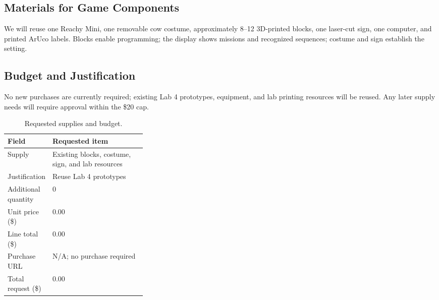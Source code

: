 \documentclass[conference,12pt,letterpaper]{IEEEtran}
\begin{document}
\subsection{Materials for Game Components}

We will reuse one Reachy Mini, one removable cow costume, approximately 8--12 3D-printed blocks, one laser-cut sign, one computer, and printed ArUco labels. Blocks enable programming; the display shows missions and recognized sequences; costume and sign establish the setting.

\subsection{Budget and Justification}

No new purchases are currently required; existing Lab 4 prototypes, equipment, and lab printing resources will be reused. Any later supply needs will require approval within the \$20 cap.

\begin{table}[H]
\centering
\caption{Requested supplies and budget.}
\label{tab:budget}
\begin{tabularx}{\linewidth}{@{}p{0.32\linewidth}Y@{}}
\hline
\textbf{Field} & \textbf{Requested item}\\
\hline
Supply & Existing blocks, costume, sign, and lab resources\\
Justification & Reuse Lab 4 prototypes\\
Additional quantity & 0\\
Unit price (\$) & 0.00\\
Line total (\$) & 0.00\\
Purchase URL & N/A; no purchase required\\
\hline
Total request (\$) & 0.00\\
\hline
\end{tabularx}
\end{table}
\end{document}
